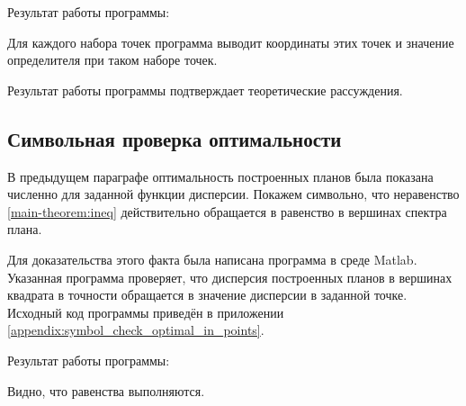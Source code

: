 Результат работы программы:


Для каждого набора точек программа выводит координаты этих точек и значение определителя при таком наборе точек.

Результат работы программы подтверждает теоретические рассуждения.


\subsection {Символьная проверка оптимальности}
В предыдущем параграфе оптимальность построенных планов была показана численно для заданной функции дисперсии. Покажем символьно, что неравенство \eqref{main-theorem:ineq} действительно обращается в равенство в вершинах спектра плана.

Для доказательства этого факта была написана программа в среде Matlab.
Указанная программа проверяет, что дисперсия построенных планов в вершинах квадрата в точности обращается в значение дисперсии в заданной точке. Исходный код программы приведён в приложении \ref{appendix:symbol_check_optimal_in_points}.

Результат работы программы:


Видно, что равенства выполняются.